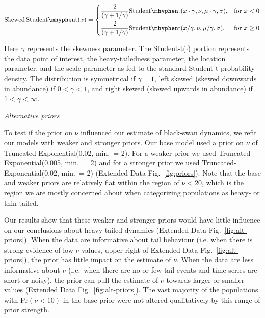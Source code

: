 \begin{equation*}
  \mathrm{Skewed\,Student\mhyphen t}(x) =
\begin{dcases}
\frac{2}{(\gamma + 1/\gamma)}
         \mathrm{Student\mhyphen t}(x \cdot \gamma, \nu, \mu \cdot \gamma, \sigma),& \text{for } x < 0\\
       \frac{2}{(\gamma + 1/\gamma)}
         \mathrm{Student\mhyphen t}(x / \gamma, \nu, \mu / \gamma, \sigma),& \text{for } x \ge 0
\end{dcases}
\end{equation*}

Here \(\gamma\) represents the skewness parameter. The Student-t(\(\cdot\)) portion represents the data point of interest, the heavy-tailedness parameter, the location parameter, and the scale parameter as fed to the standard Student-t probability density. The distribution is symmetrical if \(\gamma = 1\), left skewed (skewed downwards in abundance) if \(0 < \gamma < 1\), and right skewed (skewed upwards in abundance) if \(1 < \gamma < \infty\).

\emph{Alternative priors}

To test if the prior on \(\nu\) influenced our estimate of black-swan dynamics, we refit our models with weaker and stronger priors. Our base model used a prior on \(\nu\) of Truncated-Exponential(0.02, min.\ = 2). For a weaker prior we used Truncated-Exponential(0.005, min.\ = 2) and for a stronger prior we used Truncated-Exponential(0.02, min.\ = 2) (Extended Data Fig.~\ref{fig:priors}). Note that the base and weaker priors are relatively flat within the region of \(\nu < 20\), which is the region we are mostly concerned about when categorizing populations as heavy- or thin-tailed.

Our results show that these weaker and stronger priors would have little influence on our conclusions about heavy-tailed dynamics (Extended Data Fig.~\ref{fig:alt-priors}). When the data are informative about tail behaviour (i.e. when there is strong evidence of low \(\nu\) values, upper-right of Extended Data Fig.~\ref{fig:alt-priors}), the prior has little impact on the estimate of \(\nu\). When the data are less informative about \(\nu\) (i.e.\ when there are no or few tail events and time series are short or noisy), the prior can pull the estimate of \(\nu\) towards larger or smaller values (Extended Data Fig.~\ref{fig:alt-priors}). The vast majority of the populations with Pr\((\nu < 10)\) in the base prior were not altered qualitatively by this range of prior strength.

